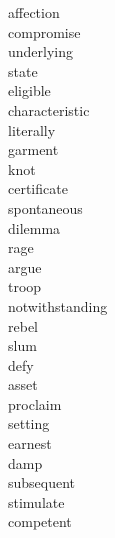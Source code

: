 \documentclass[b5paper, 11pt]{ctexart}
\begin{document}
\begin{multicols*}{3}
\begin{description}
\item[affection]

\item[compromise]

\item[underlying]

\item[state]

\item[eligible]

\item[characteristic]

\item[literally]

\item[garment]

\item[knot]

\item[certificate]

\item[spontaneous]

\item[dilemma]

\item[rage]

\item[argue]

\item[troop]

\item[notwithstanding]

\item[rebel]

\item[slum]

\item[defy]

\item[asset]

\item[proclaim]

\item[setting]

\item[earnest]

\item[damp]

\item[subsequent]

\item[stimulate]

\item[competent]


\end{description}
\end{multicols*}
\end{document}
